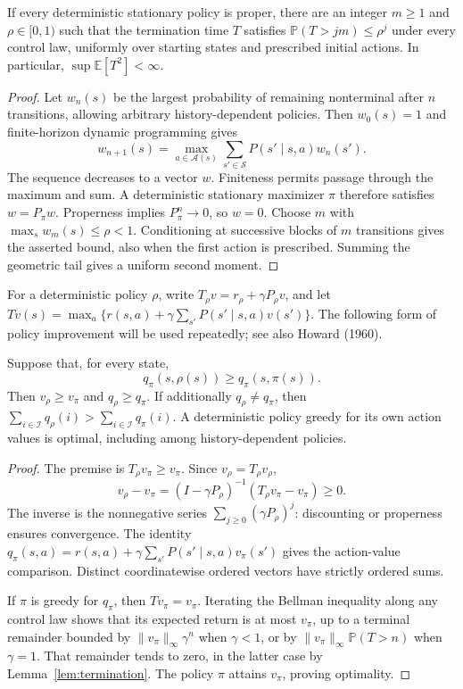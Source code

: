 \begin{lemma}\label{lem:termination}
If every deterministic stationary policy is proper, there are an integer $m\ge1$ and $\rho\in[0,1)$ such that the termination
time $T$ satisfies $\mathbb P(T>jm)\le\rho^j$ under every control law, uniformly over starting states and
prescribed initial actions. In particular, $\sup\mathbb E[T^2]<\infty$.
\end{lemma}
\begin{proof}
Let $w_n(s)$ be the largest probability of remaining nonterminal after $n$ transitions,
allowing arbitrary history-dependent policies. Then $w_0(s)=1$ and finite-horizon dynamic
programming gives
\[
w_{n+1}(s)=\max_{a\in\mathcal A(s)}\sum_{s'\in\mathcal S}P(s'\mid s,a)w_n(s').
\]
The sequence decreases to a vector $w$. Finiteness permits passage through the maximum
and sum. A deterministic stationary maximizer $\pi$ therefore satisfies $w=P_\pi w$. Properness
implies $P_\pi^n\to0$, so $w=0$. Choose $m$ with $\max_s w_m(s)\le\rho<1$. Conditioning at successive
blocks of $m$ transitions gives the asserted bound, also when the first action is prescribed.
Summing the geometric tail gives a uniform second moment.
\end{proof}

For a deterministic policy $\rho$, write $T_\rho v=r_\rho+\gamma P_\rho v$, and let $Tv(s)=\max_a\{r(s,a)+
\gamma\sum_{s'}P(s'\mid s,a)v(s')\}$. The following form of policy improvement will be used repeatedly;
see also Howard (1960).

\begin{lemma}\label{lem:improvement}
Suppose that, for every
state,
\[
q_\pi(s,\rho(s))\ge q_\pi(s,\pi(s)).
\]
Then $v_\rho\ge v_\pi$ and $q_\rho\ge q_\pi$. If additionally $q_\rho\ne q_\pi$, then $\sum_{i\in\mathcal I}q_\rho(i)>\sum_{i\in\mathcal I}q_\pi(i)$. A
deterministic policy greedy for its own action values is optimal, including among history-dependent policies.
\end{lemma}
\begin{proof}
The premise is $T_\rho v_\pi\ge v_\pi$. Since $v_\rho=T_\rho v_\rho$,
\begin{equation}\label{eq:inverse}
v_\rho-v_\pi=(I-\gamma P_\rho)^{-1}(T_\rho v_\pi-v_\pi)\ge0.
\end{equation}
The inverse is the nonnegative series $\sum_{j\ge0}(\gamma P_\rho)^j$: discounting or properness ensures convergence. The identity $q_\pi(s,a)=r(s,a)+\gamma\sum_{s'}P(s'\mid s,a)v_\pi(s')$ gives the action-value
comparison. Distinct coordinatewise ordered vectors have strictly ordered sums.

If $\pi$ is greedy for $q_\pi$, then $Tv_\pi=v_\pi$. Iterating the Bellman inequality along any control
law shows that its expected return is at most $v_\pi$, up to a terminal remainder bounded by
$\|v_\pi\|_\infty\gamma^n$ when $\gamma<1$, or by $\|v_\pi\|_\infty\mathbb P(T>n)$ when $\gamma=1$. That remainder tends to zero, in
the latter case by Lemma~\ref{lem:termination}. The policy $\pi$ attains $v_\pi$, proving optimality.
\end{proof}


